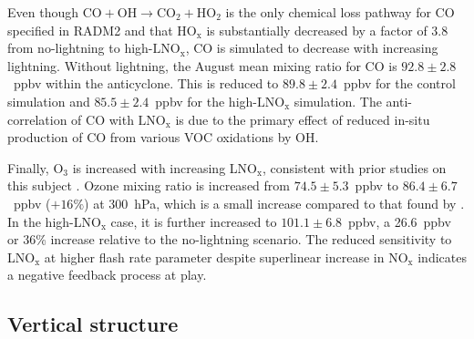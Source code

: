 Even though $\mathrm{CO+OH\rightarrow CO_2+HO_2}$ is the only
chemical loss pathway for CO specified in RADM2 and that HO$_\mathrm{x}$
is substantially decreased by a factor of 3.8 from no-lightning to high-$\mathrm{LNO_x}$,
CO is simulated to decrease with increasing lightning. Without
lightning, the August mean mixing ratio for CO is $92.8\pm2.8$~ppbv
within the anticyclone. This is reduced to $89.8\pm2.4$~ppbv for the control simulation
and $85.5\pm2.4$~ppbv for the high-$\mathrm{LNO_x}$ simulation.
The anti-correlation of CO with $\mathrm{LNO_x}$ is due to the primary
effect of reduced in-situ production of CO from various VOC oxidations
by OH.

Finally, O$_3$ is increased with increasing LNO$_\mathrm{x}$, consistent
with prior studies on this subject \citep[e.g.][]{Cooper:2007cr,Allen:2010fk}.  Ozone mixing ratio is increased from
$74.5\pm5.3$~ppbv to $86.4\pm6.7$~ppbv ($+16\%$) at 300~hPa, which is
a small increase compared to that found by \citet{Cooper:2007cr}. In the high-LNO$_{\mathrm{x}}$ case, it is
further increased to $101.1\pm6.8$~ppbv, a 26.6~ppbv or 36\% increase
relative to the no-lightning scenario. The reduced sensitivity to LNO$_{\mathrm{x}}$
at higher flash rate parameter despite superlinear increase in NO$_{\mathrm{x}}$
indicates a negative feedback process at play.


\subsection{Vertical structure}

